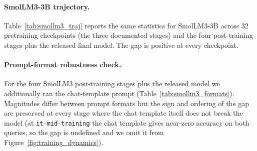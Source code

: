 \documentclass[11pt]{article}
\begin{document}
\paragraph{SmolLM3-3B trajectory.}
Table~\ref{tab:smollm3_traj} reports the same statistics for
SmolLM3-3B across 32 pretraining checkpoints (the three documented
stages) and the four post-training stages plus the released final
model. The gap is positive at every checkpoint.

\paragraph{Prompt-format robustness check.}
For the four SmolLM3 post-training stages plus the released model
we additionally ran the chat-template prompt
(Table~\ref{tab:smollm3_formats}). Magnitudes differ between prompt
formats but the sign and ordering of the gap are preserved at every
stage where the chat template itself does not break the model
(at \texttt{it-mid-training} the chat template gives near-zero
accuracy on both queries, so the gap is undefined and we omit it
from Figure~\ref{fig:training_dynamics}).

\begin{table}[!htb]
\centering
\begin{minipage}[t]{0.48\textwidth}
\centering
\scriptsize

\label{tab:smollm2_traj}
\end{minipage}
\hfill
\begin{minipage}[t]{0.48\textwidth}
\centering
\scriptsize

\label{tab:smollm3_traj}

\vspace{0.8em}

\small

\label{tab:smollm3_formats}
\end{minipage}
\end{table}

\end{document}
